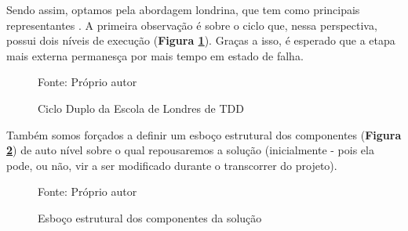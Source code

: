   Sendo assim, optamos pela abordagem londrina, que tem como principais
  representantes . A primeira observação é sobre o
  ciclo que, nessa perspectiva, possui dois níveis de execução (\textbf{Figura \ref{fig:ciclo-atdd}}). Graças a isso, é esperado que a etapa mais externa permanesça por mais tempo em estado de falha.

  \begin{figure}[h]
    \centering
    \caption{Ciclo Duplo da Escola de Londres de TDD}
    Fonte: Próprio autor\footnotemark
    \label{fig:ciclo-atdd}
  \end{figure}

   Também somos forçados a definir um esboço estrutural dos componentes (\textbf{Figura \ref{fig:esboco-estrutural}}) de auto nível sobre o qual repousaremos a solução (inicialmente - pois ela pode, ou não, vir a ser modificado durante o transcorrer do projeto).

  \begin{figure}[h]
    \centering
    \caption{Esboço estrutural dos componentes da solução}
    Fonte: Próprio autor
    \label{fig:esboco-estrutural}
  \end{figure}
